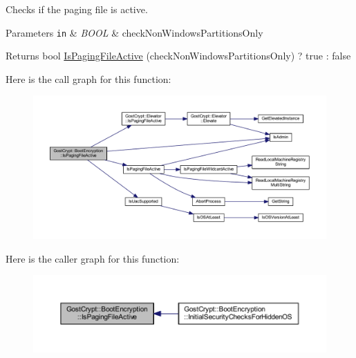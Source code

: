 Checks if the paging file is active. 


\begin{DoxyParams}[1]{Parameters}
\mbox{\tt in}  & {\em B\+O\+OL} & check\+Non\+Windows\+Partitions\+Only \\
\hline
\end{DoxyParams}
\begin{DoxyReturn}{Returns}
bool \hyperlink{_dlgcode_8c_a4683f63544f31aee5130df039402b772}{Is\+Paging\+File\+Active} (check\+Non\+Windows\+Partitions\+Only) ? true \+: false 
\end{DoxyReturn}
Here is the call graph for this function\+:
\nopagebreak
\begin{figure}[H]
\begin{center}
\leavevmode
\includegraphics[width=350pt]{class_gost_crypt_1_1_boot_encryption_a60f1f2b0d4b4ada0e8e42eef381f515b_cgraph}
\end{center}
\end{figure}
Here is the caller graph for this function\+:
\nopagebreak
\begin{figure}[H]
\begin{center}
\leavevmode
\includegraphics[width=350pt]{class_gost_crypt_1_1_boot_encryption_a60f1f2b0d4b4ada0e8e42eef381f515b_icgraph}
\end{center}
\end{figure}
\mbox{\label{class_gost_crypt_1_1_boot_encryption_a4b79045dfc8c9f05b29ebea5d02a4904}} 
